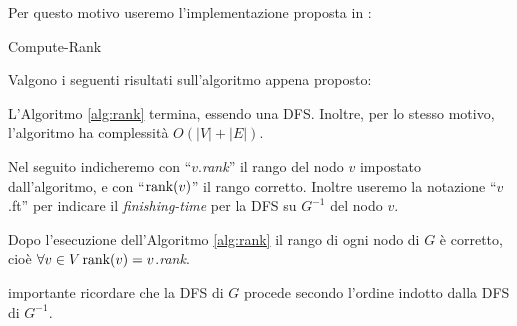 Per questo motivo useremo l'implementazione proposta in \cite{dovier}:\\
\begin{algorithm}[H]
    \label{alg:rank}
    \caption{Compute-Rank}
\end{algorithm}

Valgono i seguenti risultati sull'algoritmo appena proposto:
\begin{observation}
    L'Algoritmo \ref{alg:rank} termina, essendo una DFS. Inoltre, per lo stesso motivo, l'algoritmo ha complessità $O(|V| + |E|)$.
\end{observation}
Nel seguito indicheremo con ``$v$.\emph{rank}'' il rango del nodo $v$ impostato dall'algoritmo, e con ``$\textup{rank}(v)$'' il rango corretto. Inoltre useremo la notazione ``$v$.ft'' per indicare il \emph{finishing-time} per la DFS su $G^{-1}$ del nodo $v$.
\begin{theorem}
    \label{theo:rank_correct}
    Dopo l'esecuzione dell'Algoritmo \ref{alg:rank} il rango di ogni nodo di $G$ è corretto, cioè $\forall v \in V\, \textup{rank}(v) = v$.\emph{rank}.
\end{theorem}
\accente importante ricordare che la DFS di $G$ procede secondo l'ordine indotto dalla DFS di $G^{-1}$.

